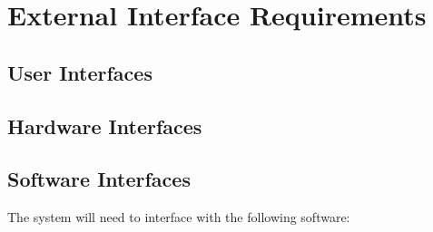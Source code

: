 \section{External Interface Requirements}

\subsection{User Interfaces}

\subsection{Hardware Interfaces}

\subsection{Software Interfaces}
The system will need to interface with the following software:
